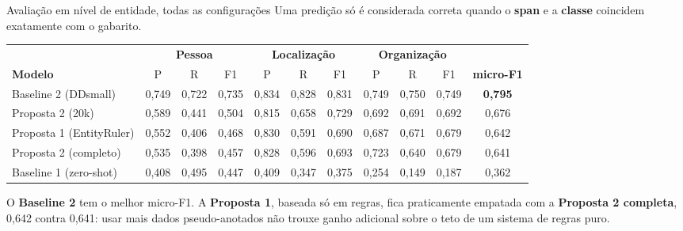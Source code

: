 \documentclass[aspectratio=169, 9pt]{beamer}
\begin{document}
\begin{frame}{Avaliação em nível de entidade, todas as configurações}
  \small
  Uma predição só é considerada correta quando o \textbf{span} e a \textbf{classe} coincidem exatamente com o gabarito.

  \vspace{6pt}
  \centering
  \scriptsize
  \begin{tabular}{lccc|ccc|ccc|c}
    \toprule
    & \multicolumn{3}{c}{\textbf{Pessoa}} & \multicolumn{3}{c}{\textbf{Localização}} & \multicolumn{3}{c}{\textbf{Organização}} & \\
    \textbf{Modelo} & P & R & F1 & P & R & F1 & P & R & F1 & \textbf{micro-F1} \\
    \midrule
    Baseline 2 (DDsmall)     & 0,749 & 0,722 & 0,735 & 0,834 & 0,828 & 0,831 & 0,749 & 0,750 & 0,749 & \textbf{0,795} \\
    Proposta 2 (20k)         & 0,589 & 0,441 & 0,504 & 0,815 & 0,658 & 0,729 & 0,692 & 0,691 & 0,692 & 0,676 \\
    Proposta 1 (EntityRuler) & 0,552 & 0,406 & 0,468 & 0,830 & 0,591 & 0,690 & 0,687 & 0,671 & 0,679 & 0,642 \\
    Proposta 2 (completo)    & 0,535 & 0,398 & 0,457 & 0,828 & 0,596 & 0,693 & 0,723 & 0,640 & 0,679 & 0,641 \\
    Baseline 1 (zero-shot)   & 0,408 & 0,495 & 0,447 & 0,409 & 0,347 & 0,375 & 0,254 & 0,149 & 0,187 & 0,362 \\
    \bottomrule
  \end{tabular}

  \vspace{8pt}
  \small
  O \textbf{Baseline 2} tem o melhor micro-F1. A \textbf{Proposta 1}, baseada só em regras, fica praticamente empatada com a \textbf{Proposta 2 completa}, 0,642 contra 0,641: usar mais dados pseudo-anotados não trouxe ganho adicional sobre o teto de um sistema de regras puro.
\end{frame}
\end{document}
